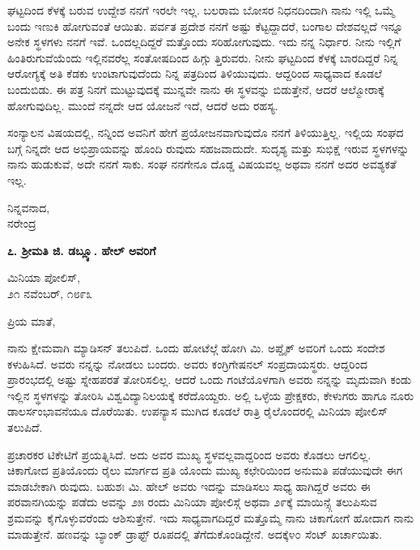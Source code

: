 ಘಟ್ಟದಿಂದ ಕೆಳಕ್ಕೆ ಬರುವ ಉದ್ದೇಶ ನನಗೆ ಇರಲೇ ಇಲ್ಲ. ಬಲರಾಮ ಬೋಸರ ನಿಧನದಿಂದಾಗಿ ನಾನು ಇಲ್ಲಿ ಒಮ್ಮೆ ಬಂದು ಇಣುಕಿ ಹೋಗುವಂತೆ ಆಯಿತು. ಪರ್ವತ ಪ್ರದೇಶ ನನಗೆ ಅಷ್ಟು ಕೆಟ್ಟದ್ದಾದರೆ, ಬಂಗಾಲ ದೇಶವಲ್ಲದೆ ಇನ್ನೂ ಅನೇಕ ಸ್ಥಳಗಳು ನನಗೆ ಇವೆ. ಒಂದಲ್ಲದಿದ್ದರೆ ಮತ್ತೊಂದು ಸರಿಹೋಗುವುದು. ಇದು ನನ್ನ ನಿರ್ಧಾರ. ನೀನು ಇಲ್ಲಿಗೆ ಹಿಂತಿರುಗುವೆಯೆಂದು ಇಲ್ಲಿನವರೆಲ್ಲ ಸಂತೋಷದಿಂದ ಹಿಗ್ಗು ತ್ತಿರುವರು. ನೀನು ಘಟ್ಟದಿಂದ ಕೆಳಕ್ಕೆ ಬಾರದಿದ್ದರೆ ನಿನ್ನ ಆರೋಗ್ಯಕ್ಕೆ ಅತಿ ಕೆಡಕು ಉಂಟಾಗುವುದೆಂದು ನಿನ್ನ ಪತ್ರದಿಂದ ತಿಳಿಯುವುದು. ಆದ್ದರಿಂದ ಸಾಧ್ಯವಾದ ಕೂಡಲೆ ಬಂದುಬಿಡು. ಈ ಪತ್ರ ನಿನಗೆ ಮುಟ್ಟುವುದಕ್ಕೆ ಮುನ್ನವೇ ನಾನು ಈ ಸ್ಥಳವನ್ನು ಬಿಡುತ್ತೇನೆ, ಆದರೆ ಆಲ್ಮೋರಾಕ್ಕೆ ಹೋಗುವುದಿಲ್ಲ. ಮುಂದೆ ನನ್ನದೇ ಆದ ಯೋಜನೆ ಇದೆ, ಆದರೆ ಅದು ರಹಸ್ಯ.

ಸಂನ್ಯಾಲನ ವಿಷಯದಲ್ಲಿ, ನನ್ನಿಂದ ಅವನಿಗೆ ಹೇಗೆ ಪ್ರಯೋಜನವಾಗುವುದೊ ನನಗೆ ತಿಳಿಯುತ್ತಿಲ್ಲ. ಇಲ್ಲಿಯ ಸಂಘದ ಬಗ್ಗೆ ನಿನ್ನದೇ ಆದ ಅಭಿಪ್ರಾಯವನ್ನು ಹೊಂದಿ ರುವುದು ಸಹಜವಾದುದೇ. ಸುದೃಶ್ಯ ಮತ್ತು ಸುಭಿಕ್ಷೆ ಇರುವ ಸ್ಥಳಗಳನ್ನು ನಾನು ಹುಡುಕುವೆ, ಅದೇ ನನಗೆ ಸಾಕು. ಸಂಘ ನನಗೇನೂ ದೊಡ್ಡ ವಿಷಯವಲ್ಲ ಅಥವಾ ನನಗೆ ಅದರ ಅವಶ್ಯಕತೆ ಇಲ್ಲ.

\begin{flushright}
ನಿನ್ನವನಾದ,\\ನರೇಂದ್ರ
\end{flushright}

\begin{center}
\textbf{೭. ಶ‍್ರೀಮತಿ ಜಿ. ಡಬ್ಲ್ಯೂ. ಹೇಲ್ ಅವರಿಗೆ}
\end{center}

\begin{flushright}
ಮಿನಿಯಾ ಪೋಲಿಸ್,\\೨೧ ನವೆಂಬರ್, ೧೮೯೩
\end{flushright}

ಪ್ರಿಯ ಮಾತೆ,

ನಾನು ಕ್ಷೇಮವಾಗಿ ಮ್ಯಾಡಿಸನ್ ತಲುಪಿದೆ. ಒಂದು ಹೋಟೆಲ್ಗೆ ಹೋಗಿ ಮಿ. ಅಪ್ಡೈಕ್ ಅವರಿಗೆ ಒಂದು ಸಂದೇಶ ಕಳುಹಿಸಿದೆ. ಅವರು ನನ್ನನ್ನು ನೋಡಲು ಬಂದರು. ಅವರು ಕಂಗ್ರಿಗೇಷನಲ್ ಸಂಪ್ರದಾಯಸ್ಥರು. ಆದ್ದರಿಂದ ಪ್ರಾರಂಭದಲ್ಲಿ ಅಷ್ಟು ಸ್ನೇಹಪರತೆ ತೋರಿಸಲಿಲ್ಲ. ಆದರೆ ಒಂದು ಗಂಟೆಯೊಳಗಾಗಿ ಅವರು ನನ್ನನ್ನು ಮೃದುವಾಗಿ ಕಂಡು ಇಲ್ಲಿನ ಸ್ಥಳಗಳನ್ನು ತೋರಿಸಿ ವಿಶ್ವವಿದ್ಯಾನಿಲಯಕ್ಕೆ ಕರೆದೊಯ್ದರು. ಅಲ್ಲಿ ಒಳ್ಳೆಯ ಪ್ರೇಕ್ಷಕರು, ಕೇಳುಗರು ಹಾಗೂ ನೂರು ಡಾಲರ್ಸಂಭಾವನೆಯೂ ದೊರೆಯಿತು. ಉಪನ್ಯಾಸ ಮುಗಿದ ಕೂಡಲೆ ರಾತ್ರಿ ರೈಲೊಂದರಲ್ಲಿ ಮಿನಿಯಾ ಪೋಲಿಸ್ ತಲುಪಿದೆ.

ಪ್ರಚಾರಕರ ಟಿಕೇಟಿಗೆ ಪ್ರಯತ್ನಿಸಿದೆ. ಅದು ಅವರ ಮುಖ್ಯ ಸ್ಥಳವಲ್ಲವಾದ್ದರಿಂದ ಅವರು ಕೊಡಲು ಆಗಲಿಲ್ಲ. ಚಿಕಾಗೋದ ಪ್ರತಿಯೊಂದು ರೈಲು ಮಾರ್ಗದ ಪ್ರತಿ ಯೊಂದು ಮುಖ್ಯ ಕಛೇರಿಯಿಂದ ಅನುಮತಿ ಪಡೆಯುವುದೇ ಈಗ ಮಾಡಬೇಕಾಗಿ ರುವುದು. ಬಹುಶಃ ಮಿ. ಹೇಲ್ ಅವರು ಇದನ್ನು ಮಾಡಿಸಲು ಸಾಧ್ಯ ಹಾಗಿದ್ದರೆ ಅವರು ಈ ಪರವಾನಗಿಯನ್ನು ಪಡೆದು ಅವನ್ನು ೨೫ ರಂದು ಮಿನಿಯಾ ಪೋಲಿಸ್ಗೆ ಅಥವಾ ೨೯ಕ್ಕೆ ಮಾಯಿನ್ಸ್ಗೆ ತಲುಪಿಸುವ ಶ್ರಮವನ್ನು ಕೈಗೊಳ್ಳುವರೆಂದು ಆಶಿಸುತ್ತೇನೆ. ಇದು ಸಾಧ್ಯವಾಗದಿದ್ದರೆ ಮತ್ತೊಮ್ಮೆ ನಾನು ಚಿಕಾಗೋಗೆ ಹೋದಾಗ ನಾನು ಮಾಡುತ್ತೇನೆ. ಹಣವನ್ನು ಬ್ಯಾಂಕ್ ಡ್ರಾಫ್ಟ್ ರೂಪದಲ್ಲಿ ತೆಗೆದುಕೊಂಡಿದ್ದೇನೆ. ಅದಕ್ಕೆ೪೦ ಸೆಂಟ್ ಖರ್ಚಾಯಿತು.

